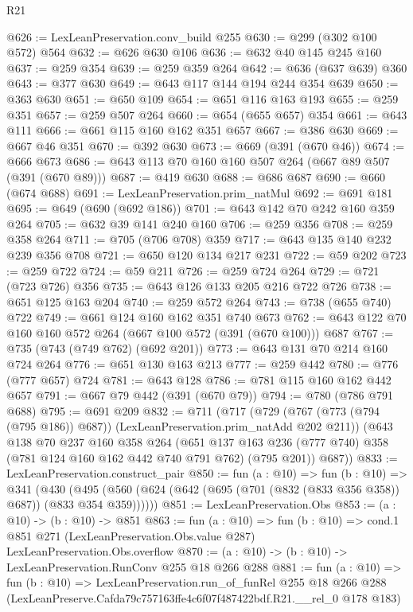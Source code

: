 \begin{lexlean}{R21}
\begin{coremodule}
@626 := LexLeanPreservation.conv_build @255
@630 := @299 (@302 @100 @572) @564
@632 := @626 @630 @106
@636 := @632 @40 @145 @245 @160
@637 := @259 @354
@639 := @259 @359 @264
@642 := @636 (@637 @639) @360
@643 := @377 @630
@649 := @643 @117 @144 @194 @244 @354 @639
@650 := @363 @630
@651 := @650 @109
@654 := @651 @116 @163 @193
@655 := @259 @351
@657 := @259 @507 @264
@660 := @654 (@655 @657) @354
@661 := @643 @111
@666 := @661 @115 @160 @162 @351 @657
@667 := @386 @630
@669 := @667 @46 @351
@670 := @392 @630
@673 := @669 (@391 (@670 @46))
@674 := @666 @673
@686 := @643 @113 @70 @160 @160 @507 @264 (@667 @89 @507 (@391 (@670 @89)))
@687 := @419 @630
@688 := @686 @687
@690 := @660 (@674 @688)
@691 := LexLeanPreservation.prim_natMul
@692 := @691 @181
@695 := @649 (@690 (@692 @186))
@701 := @643 @142 @70 @242 @160 @359 @264
@705 := @632 @39 @141 @240 @160
@706 := @259 @356
@708 := @259 @358 @264
@711 := @705 (@706 @708) @359
@717 := @643 @135 @140 @232 @239 @356 @708
@721 := @650 @120 @134 @217 @231
@722 := @59 @202
@723 := @259 @722
@724 := @59 @211
@726 := @259 @724 @264
@729 := @721 (@723 @726) @356
@735 := @643 @126 @133 @205 @216 @722 @726
@738 := @651 @125 @163 @204
@740 := @259 @572 @264
@743 := @738 (@655 @740) @722
@749 := @661 @124 @160 @162 @351 @740 @673
@762 := @643 @122 @70 @160 @160 @572 @264 (@667 @100 @572 (@391 (@670 @100))) @687
@767 := @735 (@743 (@749 @762) (@692 @201))
@773 := @643 @131 @70 @214 @160 @724 @264
@776 := @651 @130 @163 @213
@777 := @259 @442
@780 := @776 (@777 @657) @724
@781 := @643 @128
@786 := @781 @115 @160 @162 @442 @657
@791 := @667 @79 @442 (@391 (@670 @79))
@794 := @780 (@786 @791 @688)
@795 := @691 @209
@832 := @711
    (@717
      (@729 (@767 (@773 (@794 (@795 @186)) @687)) (LexLeanPreservation.prim_natAdd @202 @211))
      (@643
        @138
        @70
        @237
        @160
        @358
        @264
        (@651 @137 @163 @236 (@777 @740) @358 (@781 @124 @160 @162 @442 @740 @791 @762) (@795 @201))
        @687))
@833 := LexLeanPreservation.construct_pair
@850 := fun (a : @10) =>
  fun (b : @10) =>
  @341
    (@430 (@495 (@560 (@624 (@642 (@695 (@701 (@832 (@833 @356 @358)) @687)) (@833 @354 @359))))))
@851 := LexLeanPreservation.Obs
@853 := (a : @10) -> (b : @10) -> @851
@863 := fun (a : @10) =>
  fun (b : @10) =>
  cond.{1} @851 @271 (LexLeanPreservation.Obs.value @287) LexLeanPreservation.Obs.overflow
@870 := (a : @10) -> (b : @10) -> LexLeanPreservation.RunConv @255 @18 @266 @288
@881 := fun (a : @10) =>
  fun (b : @10) =>
  LexLeanPreservation.run_of_funRel
    @255
    @18
    @266
    @288
    (LexLeanPreserve.Cafda79c757163ffe4c6f07f487422bdf.R21.__rel_0 @178 @183)
\end{coremodule}
\end{lexlean}
